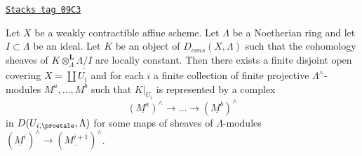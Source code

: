 \begin{lemma}
\label{proetale-lemma-local-structure-constructible-complex}
\href{https://stacks.math.columbia.edu/tag/09C3}{\texttt{Stacks tag 09C3}}

Let $X$ be a weakly contractible affine scheme. Let $\Lambda$ be a Noetherian
ring and let $I \subset \Lambda$ be an ideal. Let $K$ be an object of
$D_{cons}(X, \Lambda)$ such that the cohomology sheaves of
$K \otimes_\Lambda^\mathbf{L} \underline{\Lambda/I}$ are locally
constant. Then there exists a finite disjoint open covering
$X = \coprod U_i$ and for each $i$ a finite collection of
finite projective $\Lambda^\wedge$-modules $M^a, \ldots, M^b$
such that $K|_{U_i}$ is represented by a complex
$$
(\underline{M^a})^\wedge \to \ldots \to (\underline{M^b})^\wedge
$$
in $D(U_{i, \proetale}, \Lambda)$ for some maps of sheaves of
$\Lambda$-modules $(\underline{M^i})^\wedge \to (\underline{M^{i + 1}})^\wedge$.
\end{lemma}

